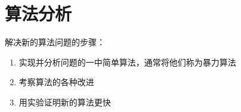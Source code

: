 \chapter{算法分析}
解决新的算法问题的步骤：
\begin{enumerate}
\item 实现并分析问题的一中简单算法，通常将他们称为暴力算法
\item 考察算法的各种改进
\item 用实验证明新的算法更快
\end{enumerate}

